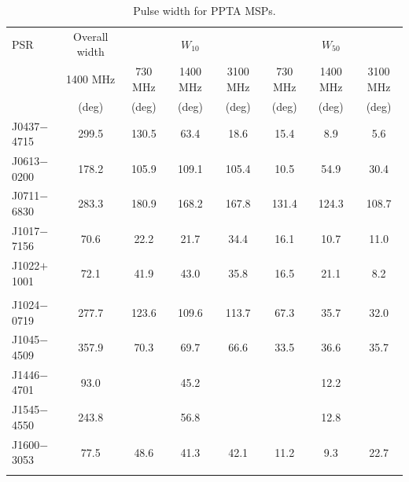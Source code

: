 \documentclass[useAMS,usenatbib]{mn2e}
\begin{document}
\begin{table}
\begin{center}
\caption{Pulse width for PPTA MSPs.}
\label{tableWidth}
\begin{tabular}{lccccccc}
\hline
PSR              &     Overall width     &               &   $W_{10}$       &                  &      &      $W_{50}$       &                      \\
								 &      1400 MHz         &  730 MHz      &          1400 MHz           &    3100 MHz      &  730 MHz      &          1400 MHz           &    3100 MHz       \\
								 &        (deg)          &    (deg)   &         (deg)          &     (deg)   &   (deg)   &         (deg)          &     (deg)  \\
\hline
J0437$-$4715     &  299.5      & 130.5     & 63.4   & 18.6   & 15.4  & 8.9   & 5.6             \\
J0613$-$0200     &  178.2      & 105.9     & 109.1  & 105.4  & 10.5  & 54.9  & 30.4             \\
J0711$-$6830     &  283.3      & 180.9     & 168.2  & 167.8  & 131.4  & 124.3  & 108.7             \\
J1017$-$7156     &  70.6       & 22.2      & 21.7   & 34.4   & 16.1  & 10.7  & 11.0             \\
J1022$+$1001     &  72.1       & 41.9      & 43.0   & 35.8   & 16.5  & 21.1  & 8.2             \\
	               &        &      &   &   &   &   &              \\
J1024$-$0719     &  277.7      & 123.6     & 109.6  & 113.7  & 67.3  & 35.7  & 32.0             \\
J1045$-$4509     &  357.9      & 70.3      & 69.7   & 66.6   & 33.5  & 36.6  & 35.7             \\
J1446$-$4701     &  93.0       &           & 45.2   &        &       & 12.2  &              \\
J1545$-$4550     &  243.8      &           & 56.8   &        &       & 12.8  &              \\
J1600$-$3053     &  77.5       & 48.6      & 41.3   & 42.1   & 11.2  & 9.3   & 22.7             \\
	               &        &      &   &   &   &   &              \\

\end{tabular}
\end{center}
\end{table}
\end{document}
